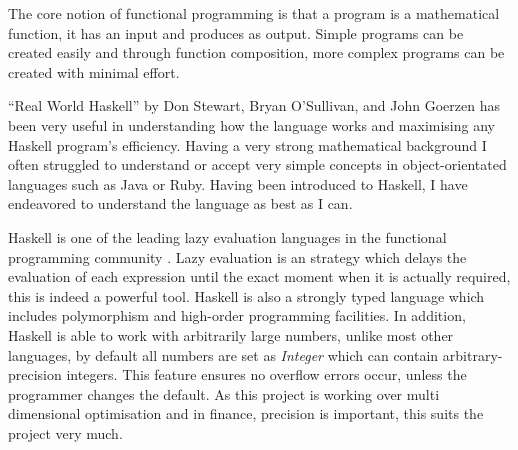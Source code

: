 \documentclass{pdfmx4020}
\begin{document}
  The core notion of functional programming is that a program is a mathematical function, it has an input and produces as output. Simple programs can be created easily and through function composition, more complex programs can be created with minimal effort.  

  ``Real World Haskell'' by Don Stewart, Bryan O'Sullivan, and John Goerzen has been very useful in understanding how the language works and maximising any Haskell program's efficiency. Having a very strong mathematical background I often struggled to understand or accept very simple concepts in object-orientated languages such as Java or Ruby. Having been introduced to Haskell, I have endeavored to understand the language as best as I can. 



  Haskell is one of the leading lazy evaluation languages in the functional programming community \cite{lazy}. Lazy evaluation is an strategy which delays the evaluation of each expression until the exact moment when it is actually required, this is indeed a powerful tool. Haskell is also a strongly typed language which includes polymorphism and high-order programming facilities. In addition, Haskell is able to work with arbitrarily large numbers, unlike most other languages, by default all numbers are set as \textit{Integer} which can contain arbitrary-precision integers. This feature ensures no overflow errors occur, unless the programmer changes the default. As this project is working over multi dimensional optimisation and in finance, precision is important, this suits the project very much.
\end{document}
